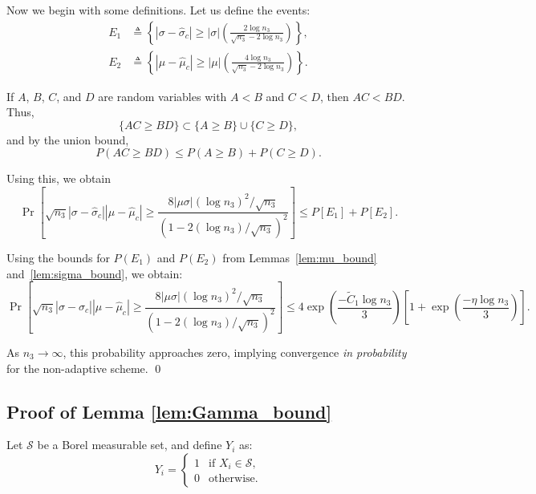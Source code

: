 \documentclass[10pt]{article} %
\theoremstyle{plain}
\theoremstyle{definition}
\theoremstyle{remark}
\newcommand{\cS}{\mathcal S}
\begin{document}
\bigskip

Now we begin with some definitions. Let us define the events: 
\begin{align*}
E_1 & \triangleq 
\left\{ 
\left| \sigma - \hat{\sigma}_c \right|
\geq 
|\sigma| 
\left( 
\frac{2 \log n_3}{\sqrt{n_3} - 2 \log n_3} 
\right)
\right\}, \\
E_2 & \triangleq 
\left\{ 
\left| \mu - \hat{\mu}_c \right|
\geq 
|\mu| 
\left( 
\frac{4 \log n_3}{\sqrt{n_3} - 2 \log n_3} 
\right)
\right\}.
\end{align*}

If \(A\), \(B\), \(C\), and \(D\) are random variables with \(A < B\) and \(C < D\), then 
\(AC < BD\). Thus,
\[
\{AC \geq BD\} \subset \{A \geq B\} \cup \{C \geq D\},
\]
and by the union bound,
\[
P(AC \geq BD) \leq P(A \geq B) + P(C \geq D).
\]

Using this, we obtain
\begin{equation*}
\Pr \left[
\sqrt{n_3}
\left| \sigma - \hat{\sigma}_c \right|
\left| \mu - \hat{\mu}_c \right|
\geq 
\frac{8 |\mu \sigma| (\log n_3)^2 / \sqrt{n_3}}
{\left( 1 - 2 (\log n_3)/\sqrt{n_3} \right)^2}
\right]
\leq 
P[E_1] + P[E_2].
\end{equation*}

Using the bounds for \(P(E_1)\) and \(P(E_2)\) from 
Lemmas~\ref{lem:mu_bound} and~\ref{lem:sigma_bound}, we obtain:
\begin{equation*}
\Pr \left[
\sqrt{n_3}
\left| \sigma - \hat{\sigma}_c \right|
\left| \mu - \hat{\mu}_c \right|
\geq 
\frac{8 |\mu \sigma| (\log n_3)^2 / \sqrt{n_3}}
{\left( 1 - 2 (\log n_3)/\sqrt{n_3} \right)^2}
\right]
\leq 
4 \exp \left( \frac{ -\tilde{C}_1\log n_3}{3} \right)
\left[
1 + \exp \left( \frac{ -\eta \log n_3}{3} \right)
\right].
\end{equation*}

As \(n_3 \to \infty\), this probability approaches zero, implying convergence 
\emph{in probability} for the non-adaptive scheme.
\qed
\subsection{Proof of Lemma \ref{lem:Gamma_bound}}
Let \( \cS \) be a Borel measurable set, and define \( Y_i \) as:
    \[
    Y_i =
    \begin{cases} 
        1 & \text{if } X_i \in \cS , \\
        0 & \text{otherwise}.
    \end{cases}
    \]
\end{document}
